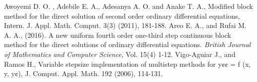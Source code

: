 \documentclass[compress, 19pt, blue]{beamer}
\begin{document}
\thebibliography{}
	Awoyemi D. O. , Adebile E. A., Adesanya A. O. and Anake T. A., Modified block method for the direct solution of second order ordinary differential equations, Intern. J. Appl. Math. Comput. 3(3) (2011), 181-188.
	Areo E. A., and Rufai M. A. A., (2016). A new uniform fourth order one-third step continuous block method for the direct solutions of ordinary differential equations. \textit{British Journal of Mathematics and Computer Science}, Vol. 15(4) 1-12.
Vigo-Aguiar J., and Ramos H., Variable stepsize implementation of multistep methods for y¢¢ = f (x, y, y¢), J. Comput. Appl. Math. 192 (2006), 114-131.
\end{document}
